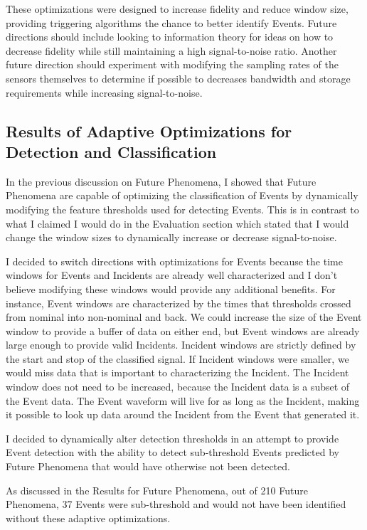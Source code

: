 These optimizations were designed to increase fidelity and reduce window size, providing triggering algorithms the chance to better identify Events. Future directions should include looking to information theory for ideas on how to decrease fidelity while still maintaining a high signal-to-noise ratio. Another future direction should experiment with modifying the sampling rates of the sensors themselves to determine if possible to decreases bandwidth and storage requirements while increasing signal-to-noise.

\subsection{Results of Adaptive Optimizations for Detection and Classification}\label{subsec:results-of-adaptive-optimizations-for-detection-and-classification}

In the previous discussion on Future Phenomena, I showed that Future Phenomena are capable of optimizing the classification of Events by dynamically modifying the feature thresholds used for detecting Events. This is in contrast to what I claimed I would do in the Evaluation section which stated that I would change the window sizes to dynamically increase or decrease signal-to-noise.

I decided to switch directions with optimizations for Events because the time windows for Events and Incidents are already well characterized and I don't believe modifying these windows would provide any additional benefits. For instance, Event windows are characterized by the times that thresholds crossed from nominal into non-nominal and back. We could increase the size of the Event window to provide a buffer of data on either end, but Event windows are already large enough to provide valid Incidents. Incident windows are strictly defined by the start and stop of the classified signal. If Incident windows were smaller, we would miss data that is important to characterizing the Incident. The Incident window does not need to be increased, because the Incident data is a subset of the Event data. The Event waveform will live for as long as the Incident, making it possible to look up data around the Incident from the Event that generated it.

I decided to dynamically alter detection thresholds in an attempt to provide Event detection with the ability to detect sub-threshold Events predicted by Future Phenomena that would have otherwise not been detected.

As discussed in the Results for Future Phenomena, out of 210 Future Phenomena, 37 Events were sub-threshold and would not have been identified without these adaptive optimizations.

